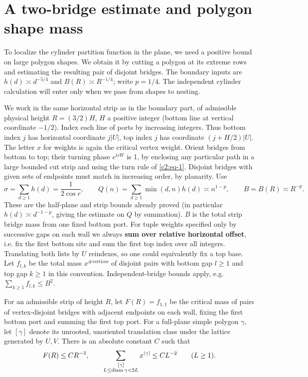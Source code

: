 \section{A two-bridge estimate and polygon shape mass}\label{c2:two-bridge}

To localize the cylinder partition function in the plane, we need a
positive bound on large polygon shapes. We obtain it by cutting a polygon
at its extreme rows and estimating the resulting pair of disjoint bridges.
The boundary inputs are \(h(d)\asymp d^{-5/4}\) and
\(B(R)\asymp R^{-1/4}\); write \(p=1/4\). The independent cylinder
calculation will enter only when we pass from shapes to nesting.

We work in the same horizontal strip as in the boundary part, of admissible physical height \(R=(3/2)H\), \(H\) a positive integer (bottom line at vertical coordinate \(-1/2\)). Index each line of ports by increasing integers. Thus bottom index \(j\) has horizontal coordinate \(j|U|\), top index \(j\) has coordinate \((j+H/2)|U|\). The letter \(x\) for weights is again the critical vertex weight. Orient bridges from bottom to top; their turning phase \(e^{\mathrm i sW}\) is 1, by enclosing any particular path in a large bounded cut strip and using the turn rule of \eqref{c2:eq-1}. Disjoint bridges with given sets of endpoints must match in increasing order, by planarity. Use
\[
 \sigma=\sum_{d\ge1}h(d)=\frac{1}{2\cos r},\qquad
 Q(n)=\sum_{d\ge1}\min(d,n)h(d)\asymp n^{1-p},\qquad
 B=B(R)\asymp R^{-p}.
\]
These are the half-plane and strip bounds already proved (in particular \(h(d)\asymp d^{-1-p}\), giving the estimate on \(Q\) by summation). \(B\) is the total strip bridge mass from one fixed bottom port. For tuple weights specified only by successive gaps on each wall we always \textbf{sum over relative horizontal offset}, i.e. fix the first bottom site and sum the first top index over all integers. Translating both lists by \(U\) reindexes, so one could equivalently fix a top base. Let \(f_{l,k}\) be the total mass \(x^{\#\text{vertices}}\) of disjoint pairs with bottom gap \(l\ge1\) and top gap \(k\ge1\) in this convention. Independent-bridge bounds apply, e.g. \(\sum_{k\ge1} f_{l,k}\le B^2\).

\begin{proposition}
\label{prop:adjacent-bridges-shapes}
For an admissible strip of height \(R\), let \(F(R)=f_{1,1}\) be the
critical mass of pairs of vertex-disjoint bridges with adjacent endpoints
on each wall, fixing the first bottom port and summing the first top port.
For a full-plane simple polygon \(\gamma\), let \([\gamma]\) denote its
unrooted, unoriented translation class under the lattice generated by
\(U,V\). There is an absolute constant \(C\) such that
\[
 F(R)\le CR^{-3},\qquad
 \sum_{\substack{[\gamma]\\L\le\operatorname{diam}\gamma<2L}}x^{|\gamma|}
 \le CL^{-2}\qquad(L\ge1).
\]
\end{proposition}

